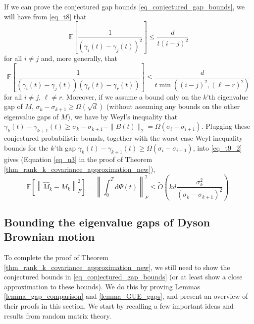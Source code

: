 \documentclass[11pt,letterpaper]{article}
\begin{document}
%
\noindent If we can prove the conjectured  gap bounds \eqref{eq_conjectured_gap_bounds}, we will have from \eqref{eq_t8} that $$ \mathbb{E}\left[\frac{1}{(\gamma_i(t) - \gamma_j(t))^2}\right] \leq \frac{d}{t (i-j)^2}$$ for all $i\neq j$ and, more generally, that  
$$ \mathbb{E}\left[\frac{1}{(\gamma_i(t) - \gamma_j(t))(\gamma_\ell(t) - \gamma_r(t))}\right] \leq \frac{d}{t \min((i-j)^2, (\ell-r)^2)}$$ for all $i\neq j$, $\ell\neq r$.
%
Moreover, if we assume a bound only on the $k$'th eigenvalue gap of $M$, $\sigma_k - \sigma_{k+1} \geq \Omega(\sqrt{d})$  (without assuming any bounds on the other eigenvalue gaps of $M$), we have by Weyl's inequality that $\gamma_k(t) - \gamma_{k+1}(t) \geq \sigma_k- \sigma_{k+1} - \|B(t)\|_2 = \Omega(\sigma_i- \sigma_{i+1})$.
%
Plugging these conjectured probabilistic bounds, together with the worst-case Weyl inequality bounds for the $k$'th gap $\gamma_k(t) - \gamma_{k+1}(t) \geq \Omega(\sigma_i- \sigma_{i+1})$, into \eqref{eq_t9_2} gives (Equation \eqref{eq_u3} in the proof of Theorem \ref{thm_rank_k_covariance_approximation_new}),
%
$$\mathbb{E}\left[\left\|\hat{M}_k -  M_k\right \|_F^2\right]= \left\|\int_0^T \mathrm{d} \Psi(t)\right\|_F^2 \leq \tilde{O}\left(kd \frac{\sigma_k^2}{(\sigma_k - \sigma_{k+1})^2}\right).$$
%

\subsection{Bounding the eigenvalue gaps of Dyson Brownian motion}\label{sec_technical_gaps}

To complete the proof of Theorem \ref{thm_rank_k_covariance_approximation_new},  we still need to show the conjectured bounds in \eqref{eq_conjectured_gap_bounds} (or at least show a close approximation to these bounds).
%
We do this by proving Lemmas \ref{lemma_gap_comparison} and \ref{lemma_GUE_gaps}, and present an overview of their proofs in this section.
%
 We start by recalling a few important ideas and results from random matrix theory.
\end{document}
